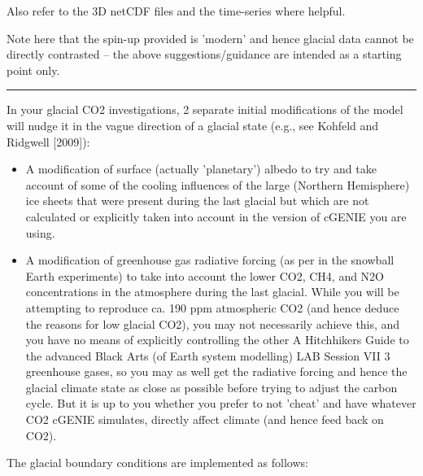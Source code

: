 \documentclass[11pt,fleqn]{book} %
\begin{document}
Also refer to the 3D netCDF files and the time-series where helpful.

Note here that the spin-up provided is 'modern' and hence glacial data cannot be directly
contrasted -- the above suggestions/guidance are intended as a starting point only.

\vspace{1mm}
\noindent\rule{4cm}{0.5pt}
\vspace{2mm}

In your glacial CO2 investigations, 2 separate initial modifications of the model will nudge it in the
vague direction of a glacial state (e.g., see Kohfeld and Ridgwell [2009]):

\begin{itemize}[noitemsep]

\item A modification of surface (actually 'planetary') albedo to try and take account of some of the
cooling influences of the large (Northern Hemisphere) ice sheets that were present during
the last glacial but which are not calculated or explicitly taken into account in the version of
cGENIE you are using.

\item A modification of greenhouse gas radiative forcing (as per in the snowball Earth
experiments) to take into account the lower CO2, CH4, and N2O concentrations in the
atmosphere during the last glacial. While you will be attempting to reproduce ca. 190 ppm
atmospheric CO2 (and hence deduce the reasons for low glacial CO2), you may not
necessarily achieve this, and you have no means of explicitly controlling the other
A Hitchhikers Guide to the advanced Black Arts (of Earth system modelling)
LAB Session VII
3
greenhouse gases, so you may as well get the radiative forcing and hence the glacial
climate state as close as possible before trying to adjust the carbon cycle. But it is up to you
whether you prefer to not 'cheat' and have whatever CO2 cGENIE simulates, directly affect
climate (and hence feed back on CO2).
\end{itemize}

The glacial boundary conditions are implemented as follows:
\end{document}
